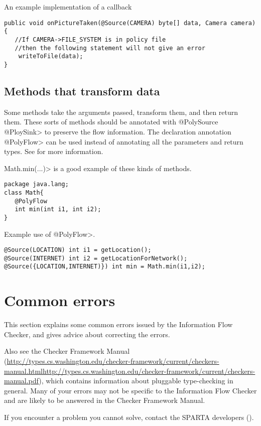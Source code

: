 An example implementation of a callback
\begin{Verbatim}
public void onPictureTaken(@Source(CAMERA) byte[] data, Camera camera){
   //If CAMERA->FILE_SYSTEM is in policy file
   //then the following statement will not give an error
    writeToFile(data);
}
\end{Verbatim}


\subsection{Methods that transform data}

Some methods take the arguments passed, transform them, and then return them.  These sorts of 
methods should be annotated with \<@PolySource @PloySink>
  to preserve the flow information.  The declaration annotation \<@PolyFlow> can be used instead of
  annotating all the parameters and return types. See  for more information. 
  
  \<Math.min(...)> is a good example of these kinds of methods. 
  
  \begin{Verbatim}
package java.lang;
class Math{
   @PolyFlow  
   int min(int i1, int i2);
}
\end{Verbatim}

Example use of \<@PolyFlow>.
\begin{Verbatim}
@Source(LOCATION) int i1 = getLocation();
@Source(INTERNET) int i2 = getLocationForNetwork();
@Source({LOCATION,INTERNET)}) int min = Math.min(i1,i2);
 \end{Verbatim}

\section{Common errors\label{errors}}

This section explains some common errors issued by the Information Flow Checker, and
gives advice about correcting the errors.   

Also see the Checker Framework Manual
(\ifhevea\url{http://types.cs.washington.edu/checker-framework/current/checkers-manual.html}\else\url{http://types.cs.washington.edu/checker-framework/current/checkers-manual.pdf}\fi),
which contains information about pluggable type-checking in general.  Many
of your errors may not be specific to the Information Flow Checker and are likely to be
answered in the Checker Framework Manual.

If you encounter a problem you cannot solve, contact the SPARTA developers ().

